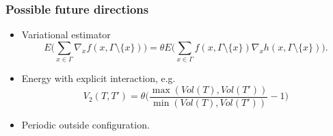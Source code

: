 \documentclass[c, 10pt]{beamer}
\begin{document}
\begin{frame}\frametitle{Possible future directions}
\begin{itemize}
\item Variational estimator
$$E \Bigg( \sum_{x \in \Gamma} \nabla_x f(x, \Gamma \setminus \{x\} ) \Bigg) = \theta E \Bigg(\sum_{x \in \Gamma} f(x, \Gamma \setminus \{x\}) \nabla_x h(x, \Gamma \setminus \{x\}) \Bigg).$$
\pause
\item Energy with explicit interaction, e.g.
$$V_2(T,T') = \theta \bigg (\frac {\max ( Vol(T), Vol(T'))}{\min(Vol(T),Vol(T'))} - 1\bigg)$$
\pause
\item Periodic outside configuration.

\end{itemize}
\end{frame}



\end{document}

